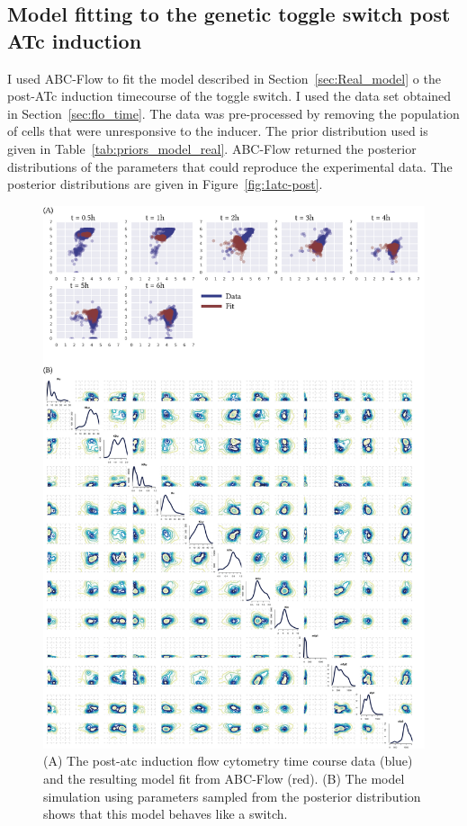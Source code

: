 \subsection{Model fitting to the genetic toggle switch post ATc induction}

I used ABC-Flow to fit the model described in Section~\ref{sec:Real_model} o the post-ATc induction timecourse of the toggle switch. I used the data set obtained in Section~\ref{sec:flo_time}. The data was pre-processed by removing the population of cells that were unresponsive to the inducer. The prior distribution used is given in Table~\ref{tab:priors_model_real}. ABC-Flow returned the posterior distributions of the parameters that could reproduce the experimental data. The posterior distributions are given in Figure~\ref{fig:1atc-post}. 


\begin{figure}[tb]
\centerfloat
	\includegraphics[width=1.2\textwidth]{../../chapters/chapterABCFlow/images/2D_real_res.png}
	\caption[ABC-Flow fit to post-\acrshort{atc} time course data]{\label{fig:1d-real-res} (A) The post-\acrshort{atc} induction flow cytometry time course data (blue) and the resulting model fit from ABC-Flow (red). (B) The model simulation using parameters sampled from the posterior distribution shows that this model behaves like a switch. }
\end{figure}

